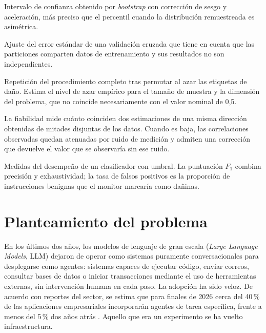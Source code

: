 \documentclass[12pt,a4paper]{article}
\newcommand{\parencite}[1]{\citep{#1}}
\begin{document}
\begin{description}[leftmargin=0pt, style=nextline, itemsep=0.45em]
  \item[Intervalo BCa] Intervalo de confianza obtenido por \textit{bootstrap} con corrección de sesgo y aceleración, más preciso que el percentil cuando la distribución remuestreada es asimétrica.

  \item[Corrección de Nadeau--Bengio] Ajuste del error estándar de una validación cruzada que tiene en cuenta que las particiones comparten datos de entrenamiento y sus resultados no son independientes.

  \item[Control con etiquetas barajadas] Repetición del procedimiento completo tras permutar al azar las etiquetas de daño. Estima el nivel de azar empírico para el tamaño de muestra y la dimensión del problema, que no coincide necesariamente con el valor nominal de 0{,}5.

  \item[Fiabilidad y atenuación] La fiabilidad mide cuánto coinciden dos estimaciones de una misma dirección obtenidas de mitades disjuntas de los datos. Cuando es baja, las correlaciones observadas quedan atenuadas por ruido de medición y admiten una corrección que devuelve el valor que se observaría sin ese ruido.

  \item[$F_1$ y tasa de falsos positivos] Medidas del desempeño de un clasificador con umbral. La puntuación $F_1$ combina precisión y exhaustividad; la tasa de falsos positivos es la proporción de instrucciones benignas que el monitor marcaría como dañinas.

\end{description}

\newpage

\section{Planteamiento del problema}

\justifying

En los últimos dos años, los modelos de lenguaje de gran escala (\textit{Large Language Models}, LLM) dejaron de operar como sistemas puramente conversacionales para desplegarse como agentes: sistemas capaces de ejecutar código, enviar correos, consultar bases de datos o iniciar transacciones mediante el uso de herramientas externas, sin intervención humana en cada paso. La adopción ha sido veloz. De acuerdo con reportes del sector, se estima que para finales de 2026 cerca del 40\,\% de las aplicaciones empresariales incorporarán agentes de tarea específica, frente a menos del 5\,\% dos años atrás \parencite{miniorange2026}. Aquello que era un experimento se ha vuelto infraestructura.
\end{document}
